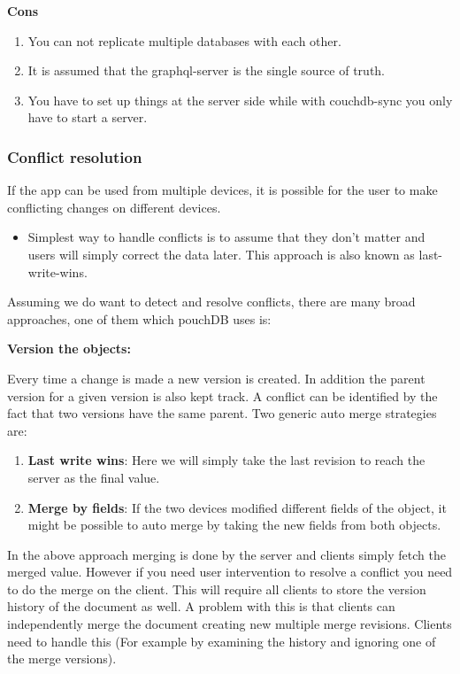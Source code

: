 \textbf{Cons}
\begin{enumerate}
    \item You can not replicate multiple databases with each other.
    \item It is assumed that the graphql-server is the single source of truth.
    \item You have to set up things at the server side while with couchdb-sync 
    you only have to start a server.~\cite{RxDBreplication}
\end{enumerate}


\subsubsection{Conflict resolution}
If the app can be used from multiple devices, it is possible for the user to make 
conflicting changes on different devices.

\begin{itemize}
    \item Simplest way to handle conflicts is to assume that they don’t matter and 
    users will simply correct the data later. This approach is also known as last-write-wins.
\end{itemize}

Assuming we do want to detect and resolve conflicts, there are many broad approaches, 
one of them which pouchDB uses is:

\textbf{Version the objects:}

Every time a change is made a new version is created. In addition the parent version for a given 
version is also kept track. A conflict can be identified by the fact that two versions have the 
same parent. Two generic auto merge strategies are:

\begin{enumerate}
    \item \textbf{Last write wins}: Here we will simply take the last revision to 
    reach the server as the final value.
    \item \textbf{Merge by fields}: If the two devices modified different fields 
    of the object, it might be possible to auto merge by taking the new fields from both objects.
\end{enumerate}

In the above approach merging is done by the server and clients simply fetch the merged value. 
However if you need user intervention to resolve a conflict you need to do the merge on the client.
This will require all clients to store the version history of the document as well. A problem with this 
is that clients can independently merge the document creating new multiple merge revisions.
Clients need to handle this (For example by examining the history and ignoring one of the merge versions).

